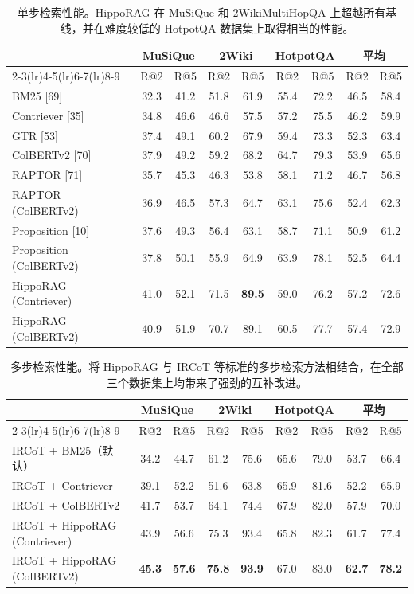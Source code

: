 \documentclass[11pt,UTF8,fontset=fandol]{ctexart}
\begin{document}
\begin{table}[H]\centering
\caption{单步检索性能。HippoRAG 在 MuSiQue 和 2WikiMultiHopQA 上超越所有基线，并在难度较低的 HotpotQA 数据集上取得相当的性能。}
\label{tab:2}
\begin{tabular}{lcccccccc}
\toprule
 & \multicolumn{2}{c}{MuSiQue} & \multicolumn{2}{c}{2Wiki} & \multicolumn{2}{c}{HotpotQA} & \multicolumn{2}{c}{平均} \\
\cmidrule(lr){2-3}\cmidrule(lr){4-5}\cmidrule(lr){6-7}\cmidrule(lr){8-9}
 & R@2 & R@5 & R@2 & R@5 & R@2 & R@5 & R@2 & R@5 \\
\midrule
BM25 [69] & 32.3 & 41.2 & 51.8 & 61.9 & 55.4 & 72.2 & 46.5 & 58.4 \\
Contriever [35] & 34.8 & 46.6 & 46.6 & 57.5 & 57.2 & 75.5 & 46.2 & 59.9 \\
GTR [53] & 37.4 & 49.1 & 60.2 & 67.9 & 59.4 & 73.3 & 52.3 & 63.4 \\
ColBERTv2 [70] & 37.9 & 49.2 & 59.2 & 68.2 & 64.7 & 79.3 & 53.9 & 65.6 \\
RAPTOR [71] & 35.7 & 45.3 & 46.3 & 53.8 & 58.1 & 71.2 & 46.7 & 56.8 \\
RAPTOR (ColBERTv2) & 36.9 & 46.5 & 57.3 & 64.7 & 63.1 & 75.6 & 52.4 & 62.3 \\
Proposition [10] & 37.6 & 49.3 & 56.4 & 63.1 & 58.7 & 71.1 & 50.9 & 61.2 \\
Proposition (ColBERTv2) & 37.8 & 50.1 & 55.9 & 64.9 & 63.9 & 78.1 & 52.5 & 64.4 \\
HippoRAG (Contriever) & 41.0 & 52.1 & 71.5 & \textbf{89.5} & 59.0 & 76.2 & 57.2 & 72.6 \\
HippoRAG (ColBERTv2) & 40.9 & 51.9 & 70.7 & 89.1 & 60.5 & 77.7 & 57.4 & 72.9 \\
\bottomrule
\end{tabular}
\end{table}

\begin{table}[H]\centering
\caption{多步检索性能。将 HippoRAG 与 IRCoT 等标准的多步检索方法相结合，在全部三个数据集上均带来了强劲的互补改进。}
\label{tab:3}
\begin{tabular}{lcccccccc}
\toprule
 & \multicolumn{2}{c}{MuSiQue} & \multicolumn{2}{c}{2Wiki} & \multicolumn{2}{c}{HotpotQA} & \multicolumn{2}{c}{平均} \\
\cmidrule(lr){2-3}\cmidrule(lr){4-5}\cmidrule(lr){6-7}\cmidrule(lr){8-9}
 & R@2 & R@5 & R@2 & R@5 & R@2 & R@5 & R@2 & R@5 \\
\midrule
IRCoT + BM25（默认） & 34.2 & 44.7 & 61.2 & 75.6 & 65.6 & 79.0 & 53.7 & 66.4 \\
IRCoT + Contriever & 39.1 & 52.2 & 51.6 & 63.8 & 65.9 & 81.6 & 52.2 & 65.9 \\
IRCoT + ColBERTv2 & 41.7 & 53.7 & 64.1 & 74.4 & 67.9 & 82.0 & 57.9 & 70.0 \\
IRCoT + HippoRAG (Contriever) & 43.9 & 56.6 & 75.3 & 93.4 & 65.8 & 82.3 & 61.7 & 77.4 \\
IRCoT + HippoRAG (ColBERTv2) & \textbf{45.3} & \textbf{57.6} & \textbf{75.8} & \textbf{93.9} & 67.0 & 83.0 & \textbf{62.7} & \textbf{78.2} \\
\bottomrule
\end{tabular}
\end{table}
\end{document}
